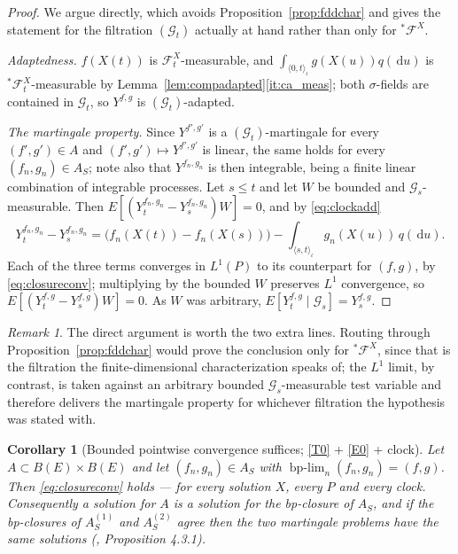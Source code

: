 \documentclass[11pt,a4paper]{article}
\theoremstyle{plain}
\newtheorem{corollary}[theorem]{Corollary}
\theoremstyle{definition}
\theoremstyle{remark}
\newtheorem{remark}[theorem]{Remark}
\newcommand{\Bdd}{B}                           %
\newcommand{\Filt}{\mathcal{F}}
\newcommand{\Gilt}{\mathcal{G}}
\newcommand{\dif}{\,\mathrm{d}}
\newcommand{\bplim}{\operatorname{bp-lim}}
\newcommand{\EK}{\cite{EK86}}
\begin{document}
\begin{proof}
  We argue directly, which avoids Proposition~\ref{prop:fddchar} and gives the
  statement for the filtration $(\Gilt_t)$ actually at hand rather than only for
  ${}^{*}\Filt^X$.

  \emph{Adaptedness.}  $f(X(t))$ is $\Filt^X_t$-measurable, and
  $\int_{\langle 0,t\rangle_\iota} g(X(u))q(\dif u)$ is ${}^{*}\Filt^X_t$-measurable
  by Lemma~\ref{lem:compadapted}\ref{it:ca_meas}; both $\sigma$-fields are
  contained in $\Gilt_t$, so $Y^{f,g}$ is $(\Gilt_t)$-adapted.

  \emph{The martingale property.}  Since $Y^{f',g'}$ is a $(\Gilt_t)$-martingale
  for every $(f',g') \in A$ and $(f',g') \mapsto Y^{f',g'}$ is linear, the same
  holds for every $(f_n,g_n) \in A_S$; note also that $Y^{f_n,g_n}$ is then
  integrable, being a finite linear combination of integrable processes.  Let
  $s \leq t$ and let $W$ be bounded and $\Gilt_s$-measurable.  Then
  $E[(Y^{f_n,g_n}_t - Y^{f_n,g_n}_s)W] = 0$, and by \eqref{eq:clockadd}
  \[
    Y^{f_n,g_n}_t - Y^{f_n,g_n}_s
      = \bigl( f_n(X(t)) - f_n(X(s)) \bigr)
        - \int_{\langle s,t \rangle_\iota} g_n(X(u)) \, q(\dif u) .
  \]
  Each of the three terms converges in $L^1(P)$ to its counterpart for $(f,g)$,
  by \eqref{eq:closureconv}; multiplying by the bounded $W$ preserves $L^1$
  convergence, so $E[(Y^{f,g}_t - Y^{f,g}_s)W] = 0$.  As $W$ was arbitrary,
  $E[Y^{f,g}_t \mid \Gilt_s] = Y^{f,g}_s$.
\end{proof}

\begin{remark}
  \label{rem:closurefiltration}
  The direct argument is worth the two extra lines.  Routing through
  Proposition~\ref{prop:fddchar} would prove the conclusion only for
  ${}^{*}\Filt^X$, since that is the filtration the finite-dimensional
  characterization speaks of; the $L^1$ limit, by contrast, is taken against an
  arbitrary bounded $\Gilt_s$-measurable test variable and therefore delivers the
  martingale property for whichever filtration the hypothesis was stated with.
\end{remark}

\begin{corollary}[Bounded pointwise convergence suffices; \eqref{T0} + \eqref{E0} + clock]
  \label{cor:bpclosure}
  Let $A \subset \Bdd(E) \times \Bdd(E)$ and let $(f_n,g_n) \in A_S$ with
  $\bplim_n (f_n,g_n) = (f,g)$.  Then \eqref{eq:closureconv} holds --- for
  \emph{every} solution $X$, every $P$ and every clock.  Consequently a solution
  for $A$ is a solution for the bp-closure of $A_S$, and if the bp-closures of
  $A^{(1)}_S$ and $A^{(2)}_S$ agree then the two martingale problems have the
  same solutions (\EK, Proposition 4.3.1).
\end{corollary}
\end{document}
